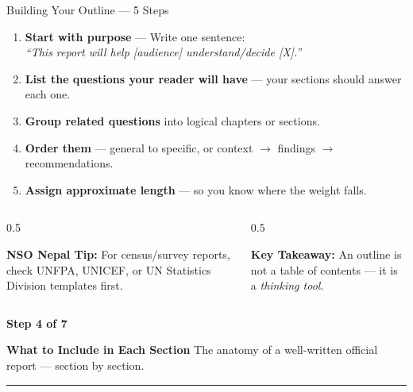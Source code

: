 \documentclass[xcolor={table,dvipsnames},aspectratio=169,11pt]{beamer}
\newcommand{\stepbadge}[1]{%
    \begin{tcolorbox}[colback=nsoGold,colframe=nsoGold,arc=8pt,auto outer arc,
        halign=center,valign=center,width=2.5cm,boxrule=0pt,top=2pt,bottom=2pt,left=2pt,right=2pt]
        \color{white}\tiny\bfseries #1
    \end{tcolorbox}%
}
\begin{document}
\begin{frame}{Building Your Outline --- 5 Steps}
    \begin{enumerate}
        \item \textbf{Start with purpose} --- Write one sentence: \\ \textit{``This report will help [audience] understand/decide [X].''}
        \item \textbf{List the questions your reader will have} --- your sections should answer each one.
        \item \textbf{Group related questions} into logical chapters or sections.
        \item \textbf{Order them} --- general to specific, or context $\rightarrow$ findings $\rightarrow$ recommendations.
        \item \textbf{Assign approximate length} --- so you know where the weight falls.
    \end{enumerate}
    \vskip 0.2cm
    \begin{columns}
        \begin{column}{0.5\textwidth}
            \begin{takeawaybox}
            \scriptsize \textbf{NSO Nepal Tip:} For census/survey reports, check UNFPA, UNICEF, or UN Statistics Division templates first.
            \end{takeawaybox}
        \end{column}
        \begin{column}{0.5\textwidth}
            \begin{takeawaybox}
            \scriptsize \textbf{Key Takeaway:} An outline is not a table of contents --- it is a \emph{thinking tool.}
            \end{takeawaybox}
        \end{column}
    \end{columns}
\end{frame}

{
\begin{frame}[plain]
    \vspace{1.5cm}
    \stepbadge{Step 4 of 7}
    \vskip 0.4cm
    {\color{white}\LARGE\bfseries What to Include in Each Section}
    \vskip 0.4cm
    {\color{nsoLight}\large The anatomy of a well-written official report --- section by section.}
    \vskip 0.8cm
    \textcolor{nsoGold}{\rule{3cm}{3pt}}
\end{frame}
}
\end{document}
